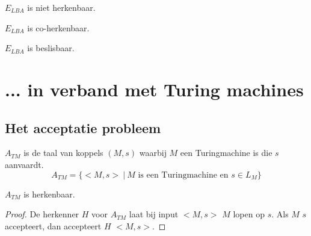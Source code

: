\documentclass[main.tex]{subfiles}
\begin{document}
\begin{st}
  \label{st:e-lba-niet-herk}
  $E_{LBA}$ is niet herkenbaar.
\end{st}

\begin{st}
  \label{st:e-lba-coherk}
  $E_{LBA}$ is co-herkenbaar.
\end{st}

\begin{gev}
  $E_{LBA}$ is beslisbaar.
\end{gev}



\section{...  in verband met Turing machines}
\label{sec:verb-met-tms}

\subsection{Het acceptatie probleem}
\label{sec:het-acceptatie-probleem}

\begin{de}
  \label{de:a-tm}
  $A_{TM}$ is de taal van koppels $(M,s)$ waarbij $M$ een Turingmachine is die $s$ aanvaardt.
  \[ A_{TM} = \{ <M,s> \ |\ M \text{ is een Turingmachine en } s \in L_{M} \} \]
\end{de}

\begin{st}
  \label{st:a-tm-herk}
  $A_{TM}$ is herkenbaar.
  \begin{proof}
    De herkenner $H$ voor $A_{TM}$ laat bij input $<M,s>$ $M$ lopen op $s$.
    Als $M$ $s$ accepteert, dan accepteert $H$ $<M,s>$.
  \end{proof}
\end{st}
\end{document}
